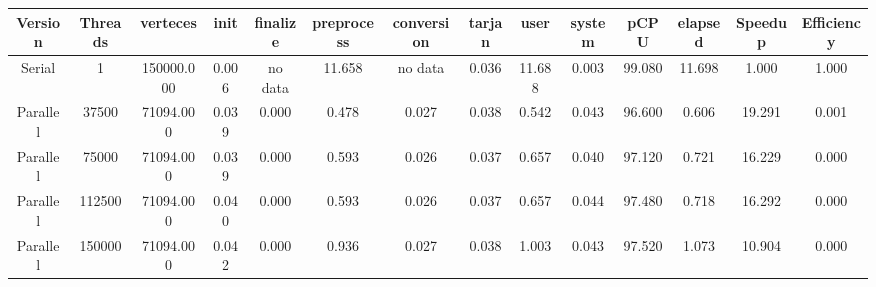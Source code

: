 \begin{tabular}{|c|c|c|c|c|c|c|c|c|c|c|c|c|c|}
\toprule
 Version &  Threads &   verteces &  init & finalize &  preprocess & conversion &  tarjan &   user &  system &   pCPU &  elapsed &  Speedup &  Efficiency \\
\midrule
  Serial &        1 & 150000.000 & 0.006 &  no data &      11.658 &    no data &   0.036 & 11.688 &   0.003 & 99.080 &   11.698 &    1.000 &       1.000 \\
Parallel &    37500 &  71094.000 & 0.039 &    0.000 &       0.478 &      0.027 &   0.038 &  0.542 &   0.043 & 96.600 &    0.606 &   19.291 &       0.001 \\
Parallel &    75000 &  71094.000 & 0.039 &    0.000 &       0.593 &      0.026 &   0.037 &  0.657 &   0.040 & 97.120 &    0.721 &   16.229 &       0.000 \\
Parallel &   112500 &  71094.000 & 0.040 &    0.000 &       0.593 &      0.026 &   0.037 &  0.657 &   0.044 & 97.480 &    0.718 &   16.292 &       0.000 \\
Parallel &   150000 &  71094.000 & 0.042 &    0.000 &       0.936 &      0.027 &   0.038 &  1.003 &   0.043 & 97.520 &    1.073 &   10.904 &       0.000 \\
\bottomrule
\end{tabular}
